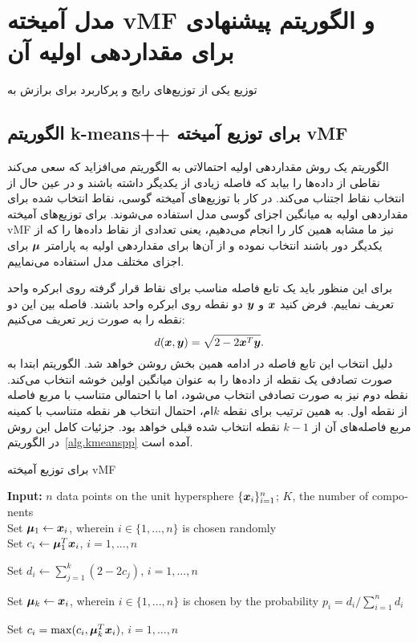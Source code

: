 \chapter{مدل آمیخته vMF و الگوریتم پیشنهادی برای مقداردهی اولیه آن} \label{ch:vMF}
توزیع
یکی از توزیع‌های رایج و پرکاربرد برای برازش به
{}
\section{الگوریتم k-means++ برای توزیع آمیخته vMF}
\label{sec.kmeanspp}
الگوریتم
یک روش مقداردهی اولیه احتمالاتی به الگوریتم
می‌افزاید که سعی می‌کند نقاطی از داده‌ها را بیابد که فاصله زیادی از یکدیگر داشته باشند و در عین حال از انتخاب نقاط
{}
اجتناب می‌کند.
در کار با توزیع‌های آمیخته گوسی، نقاط انتخاب شده برای مقداردهی اولیه به میانگین اجزای گوسی مدل استفاده می‌شوند.
برای توزیع‌های آمیخته vMF نیز ما مشابه همین کار را انجام می‌دهیم،
یعنی تعدادی از نقاط داده‌ها را که از یکدیگر دور باشند انتخاب نموده و از آن‌ها برای مقداردهی اولیه به پارامتر
$\bm{\mu}$
برای اجزای مختلف مدل استفاده می‌نماییم.

برای این منظور باید یک تابع فاصله مناسب برای نقاط قرار گرفته روی ابرکره واحد تعریف نماییم.
فرض کنید
$\bm{x}$
و
$\bm{y}$
دو نقطه روی ابرکره واحد باشند.
فاصله بین این دو نقطه را به صورت زیر تعریف می‌کنیم:
\begin{equation*}
d(\bm{x},\bm{y})= \sqrt{2- 2 \bm{x}^T \bm{y}}.
\end{equation*}
دلیل انتخاب این تابع فاصله در ادامه همین بخش روشن خواهد شد.
الگوریتم
ابتدا به صورت تصادفی یک نقطه از داده‌ها را به عنوان میانگین اولین خوشه انتخاب می‌کند.
نقطه دوم نیز به صورت تصادفی انتخاب می‌شود، اما با احتمالی متناسب با مربع فاصله از نقطه اول.
به همین ترتیب برای نقطه
$k$ام،
احتمال انتخاب هر نقطه متناسب با کمینه مربع فاصله‌های آن از 
$k-1$
نقطه انتخاب شده قبلی خواهد بود.
جزئیات کامل این روش در الگوریتم~\ref{alg.kmeanspp}
آمده است.

\begin{algorithm}[t]
	\caption{\small {} برای توزیع آمیخته vMF}
	\label{alg.kmeanspp}
	\begin{algorithmic}
		\begin{latin}
		\STATE \textbf{Input:} $n$ data points on the unit hypersphere $\{\bm{x}_i\}_{i=1}^n$; $K$, the number of components\\
		Set $\bm{\mu}_1 \gets \bm{x}_i$, wherein $i\in\{1,...,n\}$ is chosen randomly\\
		Set $c_i \gets \bm{\mu}_1^T \bm{x}_i$, $i=1,...,n$ 
		\item Set $d_i \gets \sum_{j=1}^k (2 - 2 c_j)$, $i=1,...,n$ 
		\item Set $\bm{\mu}_k \gets \bm{x}_i$, wherein $i\in\{1,...,n\}$ is chosen by the probability $p_i = d_i/\sum_{i=1}^n{d_i}$
		\item Set  $c_i = \max(c_i, \bm{\mu}_k^T \bm{x}_i)$, $i=1,...,n$ 
		\ENDFOR
		\end{latin}
	\end{algorithmic}
\end{algorithm}

